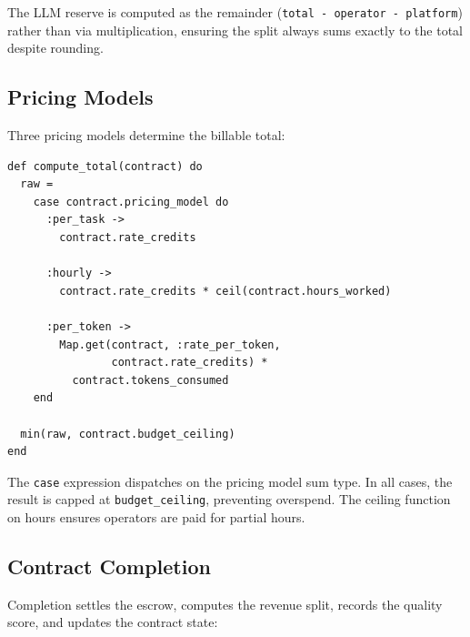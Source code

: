 \documentclass[12pt,a4paper]{article}
\theoremstyle{plain}
\theoremstyle{definition}
\begin{document}
The LLM reserve is computed as the remainder (\texttt{total - operator - platform}) rather than via multiplication, ensuring the split always sums exactly to the total despite rounding.

\subsection{Pricing Models}

Three pricing models determine the billable total:

\begin{lstlisting}[caption={Pricing model dispatch via pattern matching},label={lst:market-pricing}]
def compute_total(contract) do
  raw =
    case contract.pricing_model do
      :per_task ->
        contract.rate_credits

      :hourly ->
        contract.rate_credits * ceil(contract.hours_worked)

      :per_token ->
        Map.get(contract, :rate_per_token,
                contract.rate_credits) *
          contract.tokens_consumed
    end

  min(raw, contract.budget_ceiling)
end
\end{lstlisting}

The \texttt{case} expression dispatches on the pricing model sum type. In all cases, the result is capped at \texttt{budget\_ceiling}, preventing overspend. The ceiling function on hours ensures operators are paid for partial hours.

\subsection{Contract Completion}

Completion settles the escrow, computes the revenue split, records the quality score, and updates the contract state:
\end{document}
